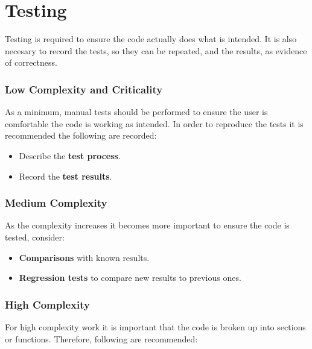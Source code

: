 \documentclass[]{book}
\providecommand{\tightlist}{%
  \setlength{\itemsep}{0pt}\setlength{\parskip}{0pt}}
\begin{document}
\hypertarget{testing}{%
\section{Testing}\label{testing}}

Testing is required to ensure the code actually does what is intended. It is also necesary to
record the tests, so they can be repeated, and the results, as evidence of correctness.

\hypertarget{low-complexity-and-criticality-1}{%
\subsubsection{Low Complexity and Criticality}\label{low-complexity-and-criticality-1}}

As a minimum, manual tests should be performed to ensure the user is comfortable the code is
working as intended. In order to reproduce the tests it is recommended the following are
recorded:

\begin{itemize}
\tightlist
\item
  Describe the \textbf{test process}.
\item
  Record the \textbf{test results}.
\end{itemize}

\hypertarget{medium-complexity-1}{%
\subsubsection{Medium Complexity}\label{medium-complexity-1}}

As the complexity increases it becomes more important to ensure the code is tested, consider:

\begin{itemize}
\tightlist
\item
  \textbf{Comparisons} with known results.
\item
  \textbf{Regression tests} to compare new results to previous ones.
\end{itemize}

\hypertarget{high-complexity-1}{%
\subsubsection{High Complexity}\label{high-complexity-1}}

For high complexity work it is important that the code is broken up into sections or
functions. Therefore, following are recommended:
\end{document}
